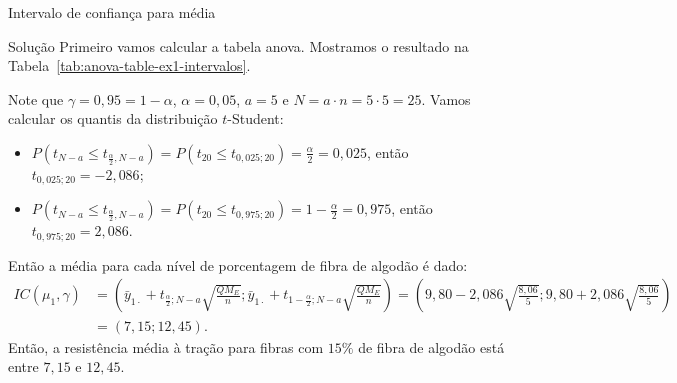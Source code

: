 \documentclass[8pt]{beamer}
\begin{document}
\begin{frame}{Intervalo de confiança para média}

\footnotesize
\begin{block}{Solução}
	Primeiro vamos calcular a tabela anova. Mostramos o resultado na Tabela~\ref{tab:anova-table-ex1-intervalos}.
	\begin{table}[ht]
		\centering
		\caption{Tabela ANOVA.} 
		\label{tab:anova-table-ex1-intervalos}
	\end{table}
	
	Note que $\gamma = 0,95 = 1 - \alpha$, $\alpha = 0,05$, $a=5$ e $N = a \cdot n = 5 \cdot 5 = 25$. Vamos calcular os quantis da distribuição $t$-Student:
	\begin{itemize}
		\item $P\left( t_{N - a} \leq t_{\frac{\alpha}{2}, N - a} \right) = P\left( t_{20} \leq t_{0,025; 20} \right) = \frac{\alpha}{2} = 0,025$, então $t_{0,025; 20} = - 2,086$;
		\item $P\left( t_{N - a} \leq t_{\frac{\alpha}{2}, N - a} \right) = P\left( t_{20} \leq t_{0,975; 20} \right) = 1- \frac{\alpha}{2} = 0,975$, então $t_{0,975; 20} =  2,086$.
	\end{itemize}
	
	Então a média para cada nível de porcentagem de fibra de algodão é dado:
	\begin{align*}
	IC(\mu_1, \gamma) &= \left( \bar{y}_{1\cdot} + t_{\frac{\alpha}{2};N - a} \sqrt{\frac{QM_E}{n}};  \bar{y}_{1\cdot} + t_{1-\frac{\alpha}{2};N - a} \sqrt{\frac{QM_E}{n}}  \right) = \left( 9,80 - 2,086 \sqrt{\frac{8,06}{5}}; 9,80 + 2,086 \sqrt{\frac{8,06}{5}} \right)\\
	&= \left( 7,15; 12,45 \right).
	\end{align*}
	Então, a resistência média à tração para fibras com $15\%$ de fibra de algodão está entre $7,15$ e $12,45$.
\end{block}
\normalsize

\end{frame}
\end{document}
